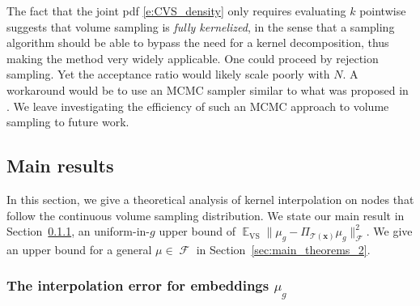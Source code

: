 \documentclass[twoside,11pt]{book}
\DeclareMathOperator{\VS}{\mathrm{VS}}
\DeclareMathOperator{\EX}{\mathbb{E}}
\DeclareMathOperator{\F}{\mathcal{F}}
\DeclareMathOperator{\Ltwo}{\mathbb{L}_{2}(\mathrm{d} \omega)}
\newcommand{\pc}[1]{\textcolor{blue}{#1}}
\begin{document}
The fact that the joint pdf \eqref{e:CVS_density} only requires evaluating $k$ pointwise suggests that volume sampling is \emph{fully kernelized}, in the sense that a sampling algorithm should be able to bypass the need for a kernel decomposition, thus making the method very widely applicable.
One could proceed by rejection sampling. Yet the acceptance ratio would likely scale poorly with $N$.  A workaround would be to use an MCMC sampler similar to what was proposed in \citep{ReGh19}. We leave investigating the efficiency of such an MCMC approach to volume sampling to future work.



\subsection{Main results}\label{sec:main_results}
In this section, we give a theoretical analysis of kernel interpolation on nodes that follow the continuous volume sampling distribution. We state our main result in Section~\ref{sec:main_theorems}, an uniform-in-$g$ upper bound of $\EX_{\VS} \|\mu_{g} - \Pi_{\mathcal{T}(\bm{x})} \mu_{g}\|_{\F}^{2}$. We give an upper bound for a general $\mu \in \F$ in Section~\ref{sec:main_theorems_2}.





\subsubsection{The interpolation error for embeddings $\mu_{g}$}\label{sec:main_theorems}
%
%
\end{document}

